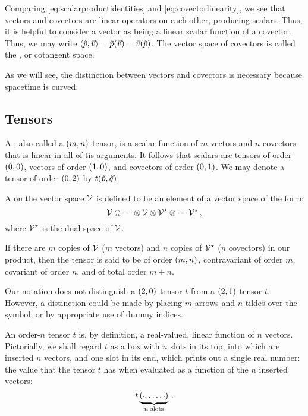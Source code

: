 Comparing \cref{eq:scalarproductidentities} and \cref{eq:covectorlinearity}, we see that vectors and covectors are linear operators on each other, producing scalars. Thus, it is helpful to consider a vector as being a linear scalar function of a covector. Thus, we may write $\sprod{\cov p}{\vec v} = \cov p\vat{\vec v} = \vec v\vat{\cov p}$. The vector space of covectors is called the , or cotangent space.

As we will see, the distinction between vectors and covectors is necessary because spacetime is curved.


\subsection{Tensors}

A , also called a $\torder mn$ tensor, is a scalar function of $m$ vectors and $n$ covectors that is linear in all of tis arguments. It follows that scalars are tensors of order $\torder 00$, vectors of order $\torder 10$, and covectors of order $\torder 01$. We may denote a tensor of order $\torder 02$ by $t\vat{\cov p,\cov q}$.

\begin{note}
  A  on the vector space $\mathcal{V}$ is defined to be an element of a vector space of the form:
  \begin{equation*}
    \mathcal{V}\otimes\dotsb\otimes\mathcal{V}\otimes\mathcal{V}^\star\otimes\dotsb\mathcal{V}^\star\,,
  \end{equation*}
  where $\mathcal{V}^\star$ is the dual space of $\mathcal{V}$.
  
  If there are $m$ copies of $\mathcal{V}$ ($m$ vectors) and $n$ copies of $\mathcal{V}^\star$ ($n$ covectors) in our product, then the tensor is said to be of order $\torder mn$, contravariant of order $m$, covariant of order $n$, and of total order $m + n$.
\end{note}

\begin{remark}
  Our notation does not distinguish a $\torder 20$ tensor $t$ from a $\torder 21$ tensor $t$. However, a distinction could be made by placing $m$ arrows and $n$ tildes over the symbol, or by appropriate use of dummy indices.
\end{remark}

\begin{note}
  An order-$n$ tensor $t$ is, by definition, a real-valued, linear function of $n$ vectors. Pictorially, we shall regard $t$ as a box with $n$ slots in its top, into which are inserted $n$ vectors, and one slot in its end, which prints out a single real number: the value that the tensor $t$ has when evaluated as a function of the $n$ inserted vectors:
  \begin{equation*}
    t\underbrace{\vat{\eslot,\dotsc,\eslot}}_{\text{$n$ slots}}\,.
  \end{equation*}
\end{note}

